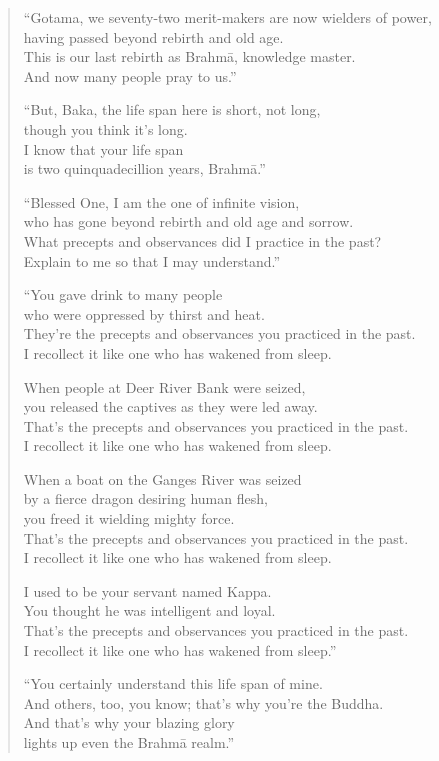 \documentclass[12pt,openany]{book}%
\begin{document}
\begin{verse}%
“Gotama, we seventy-two merit-makers are now wielders of power, \\
having passed beyond rebirth and old age. \\
This is our last rebirth as \textsanskrit{Brahmā}, knowledge master. \\
And now many people pray to us.” 

“But, Baka, the life span here is short, not long, \\
though you think it’s long. \\
I know that your life span \\
is two quinquadecillion years, \textsanskrit{Brahmā}.” 

“Blessed One, I am the one of infinite vision, \\
who has gone beyond rebirth and old age and sorrow. \\
What precepts and observances did I practice in the past? \\
Explain to me so that I may understand.” 

“You gave drink to many people \\
who were oppressed by thirst and heat. \\
They’re the precepts and observances you practiced in the past. \\
I recollect it like one who has wakened from sleep. 

When people at Deer River Bank were seized, \\
you released the captives as they were led away. \\
That’s the precepts and observances you practiced in the past. \\
I recollect it like one who has wakened from sleep. 

When a boat on the Ganges River was seized \\
by a fierce dragon desiring human flesh, \\
you freed it wielding mighty force. \\
That’s the precepts and observances you practiced in the past. \\
I recollect it like one who has wakened from sleep. 

I used to be your servant named Kappa. \\
You thought he was intelligent and loyal. \\
That’s the precepts and observances you practiced in the past. \\
I recollect it like one who has wakened from sleep.” 

“You certainly understand this life span of mine. \\
And others, too, you know; that’s why you’re the Buddha. \\
And that’s why your blazing glory \\
lights up even the \textsanskrit{Brahmā} realm.” 

%
\end{verse}
\end{document}
